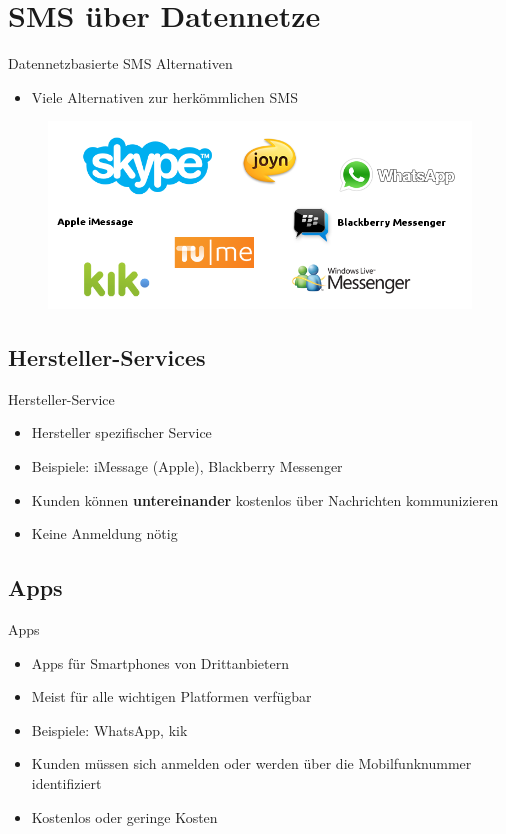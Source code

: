 \documentclass{beamer}
\begin{document}

\section{SMS über Datennetze}
\begin{frame}{Datennetzbasierte SMS Alternativen}
	\begin{itemize}
		\item Viele Alternativen zur herkömmlichen SMS
	\end{itemize}
	\begin{figure}[htm]
		\includegraphics[width=\textwidth]{img/messengers.png}
		\label{messengers}
	\end{figure}
\end{frame}

\subsection{Hersteller-Services}
\begin{frame}{Hersteller-Service}
	\begin{itemize}
		\item Hersteller spezifischer Service
		\item Beispiele: iMessage (Apple), Blackberry Messenger
		\item Kunden können \textbf{untereinander} kostenlos über Nachrichten kommunizieren
		\item Keine Anmeldung nötig
	\end{itemize}
\end{frame}

\subsection{Apps}
\begin{frame}{Apps}
	\begin{itemize}
		\item Apps für Smartphones von Drittanbietern
		\item Meist für alle wichtigen Platformen verfügbar
		\item Beispiele: WhatsApp, kik
		\item Kunden müssen sich anmelden oder werden über die Mobilfunknummer identifiziert
		\item Kostenlos oder geringe Kosten
	\end{itemize}
\end{frame}
\end{document}
